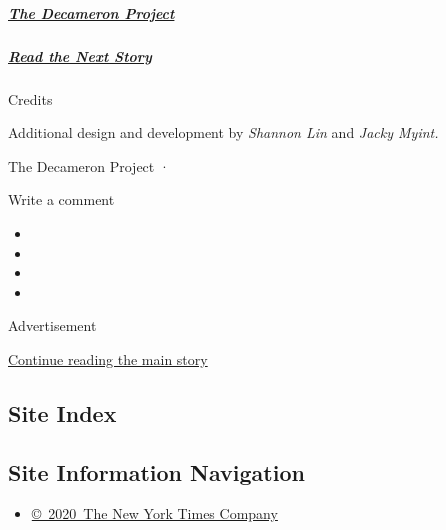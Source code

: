 \hypertarget{the-decameron-project-1}{%
\subparagraph{\texorpdfstring{\href{https://www.nytimes3xbfgragh.onion/interactive/2020/07/07/magazine/decameron-project-short-story-collection.html}{The
Decameron
Project}}{The Decameron Project}}\label{the-decameron-project-1}}

\hypertarget{read-the-next-story}{%
\subparagraph{\texorpdfstring{\href{https://www.nytimes3xbfgragh.onion/interactive/2020/07/07/magazine/nayeri-cellar-short-story.html}{Read
the Next Story}}{Read the Next Story}}\label{read-the-next-story}}

Credits

Additional design and development by \emph{Shannon Lin} and \emph{Jacky
Myint.}

The Decameron Project ·

Write a comment

\begin{itemize}
\item
\item
\item
\item
\end{itemize}

Advertisement

\protect\hyperlink{after-bottom}{Continue reading the main story}

\hypertarget{site-index}{%
\subsection{Site Index}\label{site-index}}

\hypertarget{site-information-navigation}{%
\subsection{Site Information
Navigation}\label{site-information-navigation}}

\begin{itemize}
\tightlist
\item
  \href{https://help.nytimes3xbfgragh.onion/hc/en-us/articles/115014792127-Copyright-notice}{©~2020~The
  New York Times Company}
\end{itemize}

